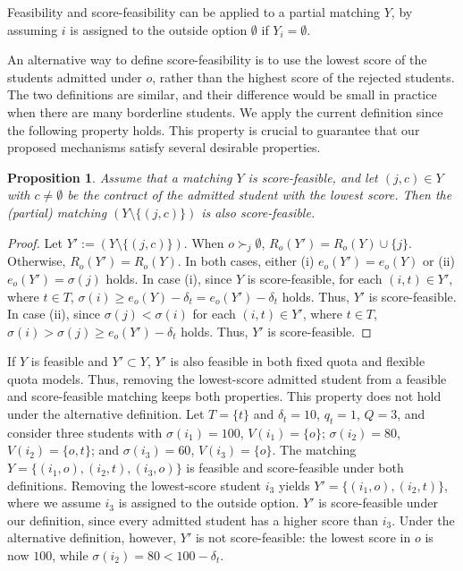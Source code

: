 \documentclass[a4paper,twoside]{article}
\newtheorem{proposition}{Proposition}
\theoremstyle{definition}
\newcommand{\zh}[1]{\textcolor{red}{\textbf{Zhaohong says:} #1}}
\begin{document}
Feasibility and score-feasibility can be applied to a partial matching $Y$, 
by assuming $i$ is assigned to the outside option $\emptyset$ if $Y_i=\emptyset$. 

An alternative way to define score-feasibility is to use the lowest score of the students
admitted under $o$, rather than the highest score of the rejected students.
The two definitions are similar, and their difference would be small in practice when there are
many borderline students.
We apply the current definition since the following property holds. 
This property is crucial to guarantee that our proposed mechanisms satisfy 
several desirable properties.
\begin{proposition}
\label{prop:remove}
Assume that a matching $Y$ is score-feasible, and let $(j,c)\in Y$ with
$c\neq\emptyset$ be the contract of the admitted student with the lowest score.
Then the (partial) matching $(Y\setminus\{(j,c)\})$ is also
score-feasible.
\end{proposition}
\begin{proof}
Let $Y':=(Y\setminus\{(j,c)\})$.
When $o \succ_j \emptyset$, $R_o(Y') = R_o(Y) \cup \{j\}$. Otherwise, $R_o(Y') = R_o(Y)$. 
In both cases, either (i) $e_o(Y')=e_o(Y)$ or (ii) $e_o(Y')=\sigma(j)$ holds. 
In case (i), since $Y$ is score-feasible, for each $(i, t) \in Y'$, where $t\in T$, 
$\sigma(i) \ge e_o(Y) - \delta_t = e_o(Y') - \delta_t$ holds. Thus, $Y'$ is score-feasible. 
In case (ii), since $\sigma(j) < \sigma(i)$ for each $(i, t) \in Y'$, where
$t \in T$, 
$\sigma(i) > \sigma(j) \geq e_o(Y') - \delta_t$ 
holds. 
Thus, $Y'$ is score-feasible. 
\end{proof}
If $Y$ is feasible and $Y' \subset Y$, $Y'$ is also feasible in both 
fixed quota and flexible quota models. 
Thus, removing the lowest-score admitted student from a feasible and score-feasible
matching keeps both properties.
This property does not hold under the alternative definition.
Let $T=\{t\}$ and $\delta_t=10$, $q_t=1$, $Q=3$, and consider three students with
$\sigma(i_1)=100$, $V(i_1)=\{o\}$; $\sigma(i_2)=80$, $V(i_2)=\{o,t\}$; and
$\sigma(i_3)=60$, $V(i_3)=\{o\}$.
The matching $Y=\{(i_1,o),(i_2,t),(i_3,o)\}$ is feasible and score-feasible under both
definitions.
Removing the lowest-score student $i_3$ yields $Y'=\{(i_1,o),(i_2,t)\}$, where
we assume $i_3$ is assigned to the outside option. 
$Y'$ is score-feasible under our definition, since every admitted student has a higher
score than $i_3$.
Under the alternative definition, however, $Y'$ is not score-feasible: the lowest score in
$o$ is now $100$, while $\sigma(i_2)=80<100-\delta_t$.
\end{document}
